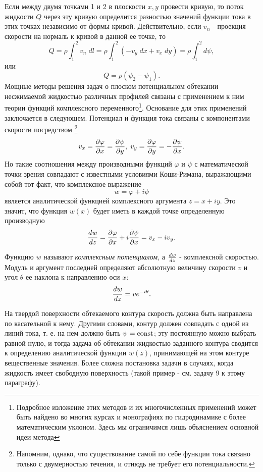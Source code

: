 Если между двумя точками 1 и 2 в плоскости $x,y$ провести кривую, то поток
жидкости $Q$ через эту кривую определится разностью значений функции тока в этих
точках независимо от формы кривой. Действительно, если $v_n$ - проекция скорости
на нормаль к кривой в данной ее точке, то
\[
   Q = \rho \int_{1}^{2} v_n\;dl =
   \rho \int_{1}^{2} (-v_y\;dx + v_x\;dy) =
   \rho \int_{1}^{2} d\psi,
\]
или
\begin{equation}
   \label{eq:10.11}
   Q = \rho (\psi_2 - \psi_1).
\end{equation}
Мощные методы решения задач о плоском потенциальном обтекании несжимаемой
жидкостью различных профилей связаны с применением к ним теории функций
комплексного переменного\footnote{Подробное изложение этих методов и их многочисленных
применений может быть найдено во многих курсах и монографиях по гидродинамике с более
математическим уклоном. Здесь мы ограничимся лишь объяснением основной идеи метода}.
Основание для этих применений заключается в следующем.
Потенциал и функция тока связаны с компонентами скорости посредством
\footnote{Напомним, однако, что существование самой по себе функции тока связано
только с двумерностью течения, и отнюдь не требует его потенциальности.}
\[
   v_x=\frac{\partial{\varphi}}{\partial{x}}=\frac{\partial{\psi}}{\partial{y}},\; v_y = \frac{\partial{\varphi}}{\partial{y}}=-\frac{\partial{\psi}}{\partial{x}}.
\]
Но такие соотношения между производными функций $\varphi$ и $\psi$ с
математической точки зрения совпадают с известными условиями Коши-Римана,
выражающими собой тот факт, что комплексное выражение
\begin{equation}
   \label{eq:10.12}
   w = \varphi + i\psi
\end{equation}
является аналитической функцией комплексного аргумента $z=x+iy$. Это значит,
что функция $w(x)$ будет иметь в каждой точке определенную производную
\begin{equation}
   \label{eq:10.13}
   \frac{d{w}}{d{z}} = \frac{\partial{\varphi}}{\partial{x}}+i \frac{\partial{\psi}}{\partial{x}} = v_x - iv_y.
\end{equation}

Функцию $w$ называют \textit{комплексным потенциалом}, а $\frac{d{w}}{d{z}}$ -
комплексной скоростью. Модуль и аргумент последней определяют абсолютную
величину скорости $v$ и угол $\theta$ ее наклона к направлению оси $x$:
\begin{equation}
   \label{eq:10.14}
   \frac{d{w}}{d{z}} = v e^{-i\theta}.
\end{equation}

На твердой поверхности обтекаемого контура скорость должна быть направлена по
касательной к нему. Другими словами, контур должен совпадать с одной из линий
тока, т. е. на нем должно быть $\psi = \mathop{\mathrm{const}}\nolimits$; эту постоянную можно выбрать
равной нулю, и тогда задача об обтекании жидкостью заданного контура сводится к
определению аналитической функции $w(z)$, принимающей на этом контуре
вещественные значения. Более сложна постановка задачи в случаях, когда жидкость
имеет свободную поверхность (такой пример - см. задачу 9 к этому параграфу).


